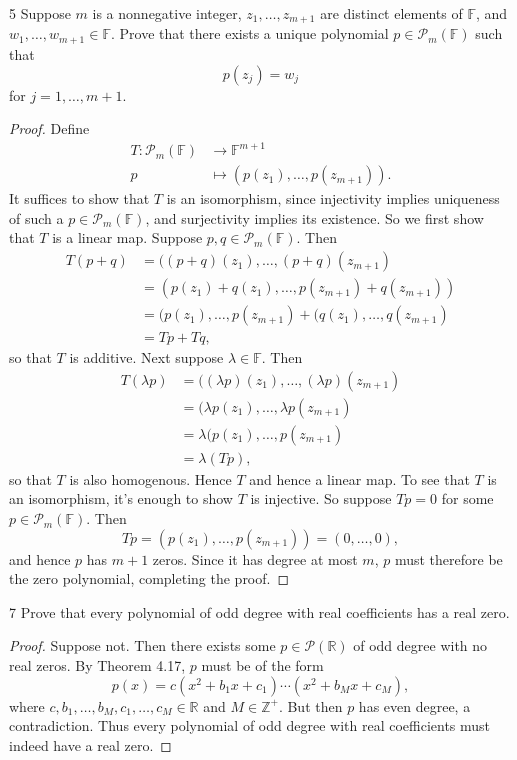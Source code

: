 \documentclass{extarticle}
\newenvironment{problem}[1]{\begin{prob*}{#1}{}}{\end{prob*}}
\newcommand{\Z}{\mathbb{Z}}
\newcommand{\R}{\mathbb{R}}
\newcommand{\F}{\mathbb{F}}
\newcommand{\poly}{\mathcal{P}}
\begin{document}
\begin{problem}{5}
Suppose $m$ is a nonnegative integer, $z_1,\dots, z_{m+1}$ are distinct elements of $\F$, and $w_1,\dots, w_{m+1}\in\F$.  Prove that there exists a unique polynomial $p\in\poly_m(\F)$ such that 
\begin{equation*}
p(z_j) = w_j
\end{equation*}
for $j = 1,\dots,m+1$.  
\end{problem}
\begin{proof}
Define 
\begin{align*}
T:\poly_m(\F)&\to \F^{m + 1}\\
    p &\mapsto (p(z_1), \dots, p(z_{m+1})).
\end{align*}
It suffices to show that $T$ is an isomorphism, since injectivity implies uniqueness of such a $p\in\poly_m(\F)$, and surjectivity implies its existence.  So we first show that $T$ is a linear map.  Suppose $p,q\in\poly_m(\F)$.  Then
\begin{align*}
T(p + q) &= ((p + q)(z_1), \dots, (p + q)(z_{m+1})\\
&= (p(z_1) + q(z_1), \dots, p(z_{m+1}) + q(z_{m+1}))\\
&= (p(z_1), \dots, p(z_{m+1}) + (q(z_1), \dots, q(z_{m+1})\\
&= Tp + Tq,
\end{align*}
so that $T$ is additive.  Next suppose $\lambda\in\F$.  Then
\begin{align*}
T(\lambda p) &= ((\lambda p)(z_1), \dots, (\lambda p)(z_{m+1})\\
&= (\lambda p(z_1), \dots, \lambda p(z_{m+1})\\
&= \lambda (p(z_1), \dots, p(z_{m+1})\\
&= \lambda (Tp),
\end{align*}
so that $T$ is also homogenous.  Hence $T$ and hence a linear map.  To see that $T$ is an isomorphism, it's enough to show $T$ is injective.  So suppose $Tp = 0$ for some $p\in\poly_m(\F)$.  Then
\begin{equation*}
Tp = (p(z_1), \dots, p(z_{m+1})) = (0, \dots, 0),
\end{equation*}
and hence $p$ has $m + 1$ zeros.  Since it has degree at most $m$, $p$ must therefore be the zero polynomial, completing the proof.
\end{proof}

\begin{problem}{7}
Prove that every polynomial of odd degree with real coefficients has a real zero.
\end{problem}
\begin{proof}
Suppose not.  Then there exists some $p\in\poly(\R)$ of odd degree with no real zeros.  By Theorem 4.17, $p$ must be of the form
\begin{equation*}
p(x) = c(x^2 + b_1x + c_1)\cdots(x^2 + b_Mx + c_M),
\end{equation*}
where $c,b_1,\dots,b_M,c_1,\dots,c_M\in\R$ and $M\in\Z^+$.  But then $p$ has even degree, a contradiction.  Thus every polynomial of odd degree with real coefficients must indeed have a real zero.
\end{proof}
\end{document}
